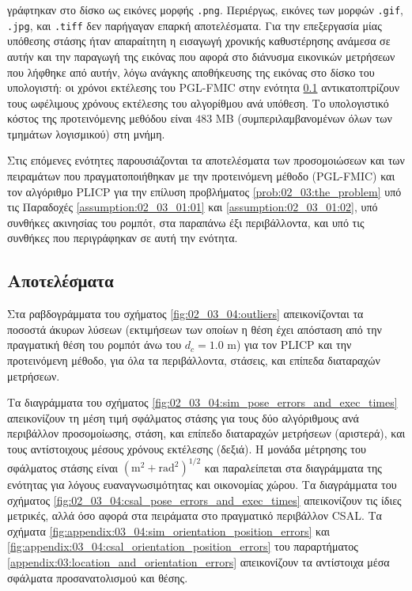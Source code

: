 γράφτηκαν στο δίσκο ως εικόνες μορφής \texttt{.png}. Περιέργως, εικόνες των
μορφών \texttt{.gif}, \texttt{.jpg}, και \texttt{.tiff} δεν παρήγαγαν επαρκή
αποτελέσματα. Για την επεξεργασία μίας υπόθεσης στάσης ήταν απαραίτητη η
εισαγωγή χρονικής καθυστέρησης ανάμεσα σε αυτήν και την παραγωγή της εικόνας
που αφορά στο διάνυσμα εικονικών μετρήσεων που λήφθηκε από αυτήν, λόγω ανάγκης
αποθήκευσης της εικόνας στο δίσκο του υπολογιστή: οι χρόνοι εκτέλεσης του
PGL-FMIC στην ενότητα \ref{subsection:02_03_04:02} αντικατοπτρίζουν τους
ωφέλιμους χρόνους εκτέλεσης του αλγορίθμου ανά υπόθεση. Το υπολογιστικό κόστος
της προτεινόμενης μεθόδου είναι $483$ MB (συμπεριλαμβανομένων όλων των τμημάτων
λογισμικού) στη μνήμη.

Στις επόμενες ενότητες παρουσιάζονται τα αποτελέσματα των προσομοιώσεων και των
πειραμάτων που πραγματοποιήθηκαν με την προτεινόμενη μέθοδο (PGL-FMIC) και τον
αλγόριθμο PLICP για την επίλυση προβλήματος \ref{prob:02_03:the_problem} υπό
τις Παραδοχές \ref{assumption:02_03_01:01} και \ref{assumption:02_03_01:02},
υπό συνθήκες ακινησίας του ρομπότ, στα παραπάνω έξι περιβάλλοντα, και υπό τις
συνθήκες που περιγράφηκαν σε αυτή την ενότητα.

\subsection{Αποτελέσματα}
\label{subsection:02_03_04:02}

Στα ραβδογράμματα του σχήματος \ref{fig:02_03_04:outliers} απεικονίζονται τα
ποσοστά άκυρων λύσεων (εκτιμήσεων των οποίων η θέση έχει απόσταση από την
πραγματική θέση του ρομπότ άνω του $d_c = 1.0$ m) για τον PLICP και την
προτεινόμενη μέθοδο, για όλα τα περιβάλλοντα, στάσεις, και επίπεδα διαταραχών
μετρήσεων.

Τα διαγράμματα του σχήματος \ref{fig:02_03_04:sim_pose_errors_and_exec_times}
απεικονίζουν τη μέση τιμή σφάλματος στάσης για τους δύο αλγόριθμους
ανά περιβάλλον προσομοίωσης, στάση, και επίπεδο διαταραχών μετρήσεων
(αριστερά), και τους αντίστοιχους μέσους χρόνους εκτέλεσης (δεξιά). Η μονάδα
μέτρησης του σφάλματος στάσης είναι $(\text{m}^2 + \text{rad}^2)^{1/2}$ και
παραλείπεται στα διαγράμματα της ενότητας για λόγους ευαναγνωσιμότητας και
οικονομίας χώρου. Τα διαγράμματα του σχήματος
\ref{fig:02_03_04:csal_pose_errors_and_exec_times} απεικονίζουν τις ίδιες
μετρικές, αλλά όσο αφορά στα πειράματα στο πραγματικό περιβάλλον CSAL.
Τα σχήματα \ref{fig:appendix:03_04:sim_orientation_position_errors} και
\ref{fig:appendix:03_04:csal_orientation_position_errors} του παραρτήματος
\ref{appendix:03:location_and_orientation_errors} απεικονίζουν τα αντίστοιχα
μέσα σφάλματα προσανατολισμού και θέσης.

